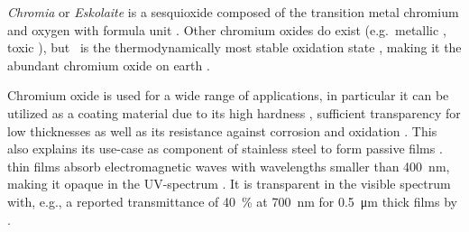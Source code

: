 
\emph{Chromia} or \emph{Eskolaite} is a sesquioxide composed of the transition metal chro\-mi\-um and oxygen with formula unit .
Other chromium oxides do exist (e.g.\ metallic , toxic ), but \cro\ is the thermodynamically most stable oxidation state 
    \cite{robbert1998,al-kuhaili2007,lebreau2014},
making it the abundant chromium oxide on earth
    \cite{mi2018}.

Chromium oxide is used for a wide range of applications, in particular it can be utilized as a coating material due to its high hardness
    \cite{shackelford2000},
sufficient transparency for low thicknesses
    \cite{lai2003}
as well as its resistance against corrosion and oxidation
    \cite{nable2004}. 
This also explains its use-case as component of stainless steel to form passive films
    \cite{lebreau2014}.
 thin films absorb electromagnetic waves with wavelengths smaller than \qty{400}{\nm}, making it opaque in the \acrshort{UV}-spectrum \cite{cheng1996,guillen2021}.
It is transparent in the visible spectrum with, e.g., a reported transmittance of \qty{40}{\percent} at \qty{700}{\nm} for \qty{0.5}{\um} thick films by \textcite{cheng1996}.

